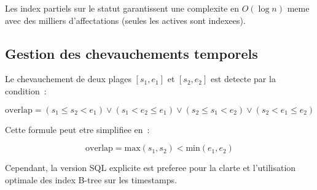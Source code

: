 \documentclass[12pt,a4paper]{report}
\begin{document}
\begin{enumerate}[leftmargin=2cm]
Les index partiels sur le statut garantissent une complexite en $O(\log n)$
meme avec des milliers d'affectations (seules les actives sont indexees).

\subsection{Gestion des chevauchements temporels}

Le chevauchement de deux plages $[s_1, e_1]$ et $[s_2, e_2]$ est detecte
par la condition~:

\begin{equation}
\text{overlap} = (s_1 \leq s_2 < e_1) \lor (s_1 < e_2 \leq e_1) \lor (s_2 \leq s_1 < e_2) \lor (s_2 < e_1 \leq e_2)
\end{equation}

Cette formule peut etre simplifiee en~:

\begin{equation}
\text{overlap} = \text{max}(s_1, s_2) < \text{min}(e_1, e_2)
\end{equation}

Cependant, la version SQL explicite est preferee pour la clarte et l'utilisation
optimale des index B-tree sur les timestamps.


\end{enumerate}
\end{document}
